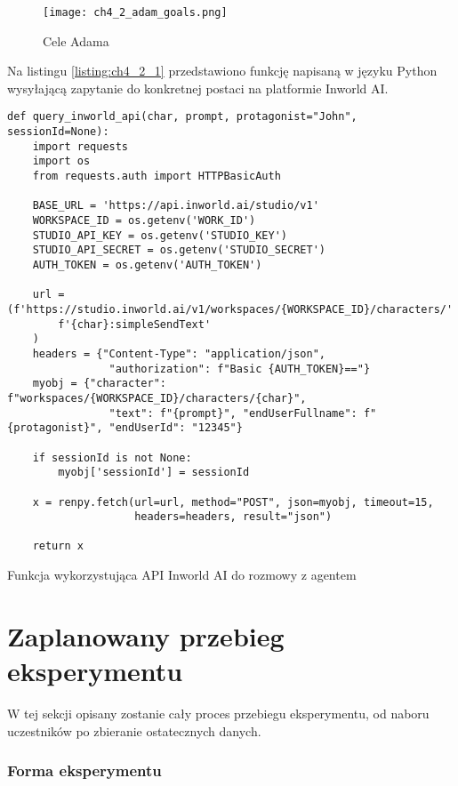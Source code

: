 \begin{figure}[h!]
    \centering
    \texttt{[image: ch4\_2\_adam\_goals.png]}
    \caption{Cele Adama}
    \label{fig:ch4_2_adam_goals}
\end{figure}

\newpage

Na listingu \ref{listing:ch4_2_1} przedstawiono funkcję napisaną w języku Python wysyłającą zapytanie
do konkretnej postaci na platformie Inworld AI.

\begin{listing}
    \begin{verbatim}  
def query_inworld_api(char, prompt, protagonist="John", sessionId=None):
    import requests
    import os
    from requests.auth import HTTPBasicAuth

    BASE_URL = 'https://api.inworld.ai/studio/v1'
    WORKSPACE_ID = os.getenv('WORK_ID')
    STUDIO_API_KEY = os.getenv('STUDIO_KEY')
    STUDIO_API_SECRET = os.getenv('STUDIO_SECRET')
    AUTH_TOKEN = os.getenv('AUTH_TOKEN')

    url = (f'https://studio.inworld.ai/v1/workspaces/{WORKSPACE_ID}/characters/'
        f'{char}:simpleSendText'
    )
    headers = {"Content-Type": "application/json",
                "authorization": f"Basic {AUTH_TOKEN}=="}
    myobj = {"character": f"workspaces/{WORKSPACE_ID}/characters/{char}",
                "text": f"{prompt}", "endUserFullname": f"{protagonist}", "endUserId": "12345"}

    if sessionId is not None:
        myobj['sessionId'] = sessionId

    x = renpy.fetch(url=url, method="POST", json=myobj, timeout=15,
                    headers=headers, result="json")

    return x
\end{verbatim}
    \caption{Funkcja wykorzystująca API Inworld AI do rozmowy z agentem} \label{listing:ch4_2_1}
\end{listing}

\section{Zaplanowany przebieg eksperymentu}\label{section:ch4_3}

W tej sekcji opisany zostanie cały proces przebiegu eksperymentu, od naboru uczestników po
zbieranie ostatecznych danych.

\subsubsection*{Forma eksperymentu}

